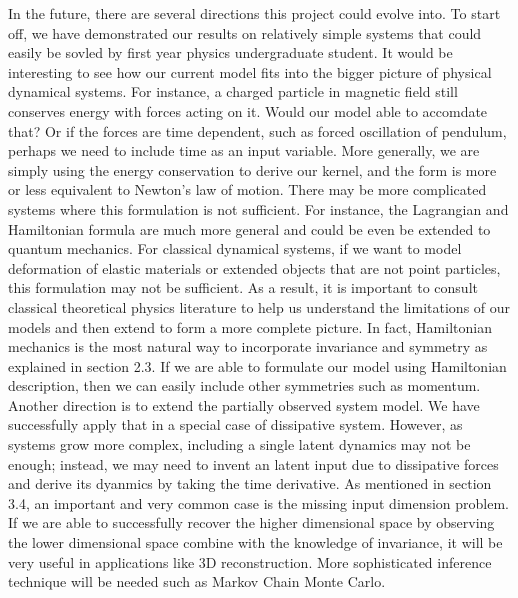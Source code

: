 \documentclass{statsmsc}
\begin{document}
In the future, there are several directions this project could evolve into.
To start off, we have demonstrated our results on relatively simple systems that could easily be sovled by first year physics undergraduate student. 
It would be interesting to see how our current model fits into the bigger picture of physical dynamical systems.
For instance, a charged particle in magnetic field still conserves energy with forces acting on it. 
Would our model able to accomdate that?
Or if the forces are time dependent, such as forced oscillation of pendulum, perhaps we need to include time as an input variable.
More generally, we are simply using the energy conservation to derive our kernel, and the form is more or less equivalent to Newton's law of motion.
There may be more complicated systems where this formulation is not sufficient.
For instance, the Lagrangian and Hamiltonian formula are much more general and could be even be extended to quantum mechanics.
For classical dynamical systems, if we want to model deformation of elastic materials or extended objects that are not point particles, this formulation may not be sufficient.
As a result, it is important to consult classical theoretical physics literature to help us understand the limitations of our models and then extend to form a more complete picture.  
In fact, Hamiltonian mechanics is the most natural way to incorporate invariance and symmetry as explained in section 2.3.
If we are able to formulate our model using Hamiltonian description, then we can easily include other symmetries such as momentum.
Another direction is to extend the partially observed system model.
We have successfully apply that in a special case of dissipative system.
However, as systems grow more complex, including a single latent dynamics may not be enough; instead, we may need to invent an latent input due to dissipative forces and derive its dyanmics by taking the time derivative.
As mentioned in section 3.4, an important and very common case is the missing input dimension problem.
If we are able to successfully recover the higher dimensional space by observing the lower dimensional space combine with the knowledge of invariance, it will be very useful in applications like 3D reconstruction.
More sophisticated inference technique will be needed such as Markov Chain Monte Carlo.






\clearpage
\renewcommand*{\thepage}{A\arabic{page}}
\appendix
\end{document}
